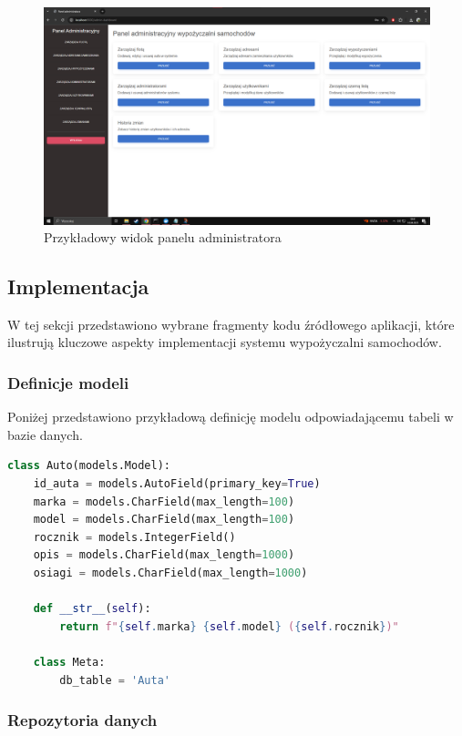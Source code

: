 \documentclass[12pt,a4paper]{article}
\begin{document}
\begin{figure}[H]
    \centering
    \includegraphics[width=1.1\textwidth]{admin_panel.png}
    \caption{Przykładowy widok panelu administratora}
    \label{fig:admin-panel}
\end{figure}

\newpage

\subsection{Implementacja}

W tej sekcji przedstawiono wybrane fragmenty kodu źródłowego aplikacji, które ilustrują kluczowe aspekty implementacji systemu wypożyczalni samochodów.

\subsubsection{Definicje modeli}

Poniżej przedstawiono przykładową definicję modelu odpowiadającemu tabeli w bazie danych.

\begin{lstlisting}[language=Python, caption={Definicja modelu Auto}]
class Auto(models.Model):
    id_auta = models.AutoField(primary_key=True)
    marka = models.CharField(max_length=100)
    model = models.CharField(max_length=100)
    rocznik = models.IntegerField()
    opis = models.CharField(max_length=1000)
    osiagi = models.CharField(max_length=1000)
    
    def __str__(self):
        return f"{self.marka} {self.model} ({self.rocznik})"
        
    class Meta:
        db_table = 'Auta'
\end{lstlisting}

\subsubsection{Repozytoria danych}
\end{document}
